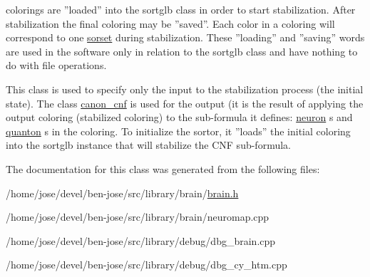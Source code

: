 colorings are ''loaded'' into the sortglb class in order to start stabilization. After stabilization the final coloring may be ''saved''. Each color in a coloring will correspond to one \hyperlink{classsorset}{sorset} during stabilization. These ''loading'' and ''saving'' words are used in the software only in relation to the sortglb class and have nothing to do with file operations.

This class is used to specify only the input to the stabilization process (the initial state). The class \hyperlink{classcanon__cnf}{canon\+\_\+cnf} is used for the output (it is the result of applying the output coloring (stabilized coloring) to the sub-\/formula it defines\+: \hyperlink{classneuron}{neuron} s and \hyperlink{classquanton}{quanton} s in the coloring. To initialize the sortor, it ''loads'' the initial coloring into the sortglb instance that will stabilize the C\+N\+F sub-\/formula. 

The documentation for this class was generated from the following files\+:\begin{DoxyCompactItemize}
\item 
/home/jose/devel/ben-\/jose/src/library/brain/\hyperlink{brain_8h}{brain.\+h}\item 
/home/jose/devel/ben-\/jose/src/library/brain/neuromap.\+cpp\item 
/home/jose/devel/ben-\/jose/src/library/debug/dbg\+\_\+brain.\+cpp\item 
/home/jose/devel/ben-\/jose/src/library/debug/dbg\+\_\+cy\+\_\+htm.\+cpp\end{DoxyCompactItemize}
